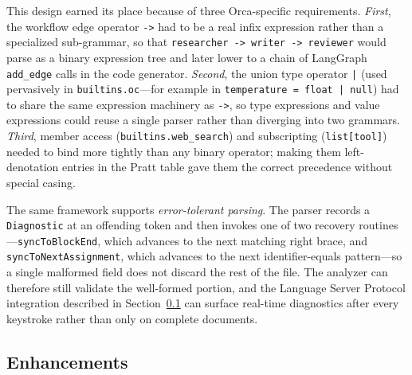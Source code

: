 \documentclass[sigconf,nonacm]{acmart}
\begin{document}
This design earned its place because of three Orca-specific requirements.
\emph{First}, the workflow edge operator \texttt{->} had to be a real
infix expression rather than a specialized sub-grammar, so that
\texttt{researcher -> writer -> reviewer} would parse as a binary
expression tree and later lower to a chain of LangGraph \texttt{add\_edge}
calls in the code generator. \emph{Second}, the union type operator
\texttt{|} (used pervasively in \texttt{builtins.oc}---for example in
\texttt{temperature = float | null}) had to share the same expression
machinery as \texttt{->}, so type expressions and value expressions could
reuse a single parser rather than diverging into two grammars.
\emph{Third}, member access (\texttt{builtins.web\_search}) and
subscripting (\texttt{list[tool]}) needed to bind more tightly than any
binary operator; making them left-denotation entries in the Pratt table
gave them the correct precedence without special casing.

The same framework supports \emph{error-tolerant parsing}. The parser
records a \texttt{Diagnostic} at an offending token and then invokes one of
two recovery routines---\texttt{syncToBlockEnd}, which advances to the next
matching right brace, and \texttt{syncToNextAssignment}, which advances to
the next identifier-equals pattern---so a single malformed field does not
discard the rest of the file. The analyzer can therefore still validate the
well-formed portion, and the Language Server Protocol integration described
in Section~\ref{sec:implementation:enhancements} can surface real-time
diagnostics after every keystroke rather than only on complete documents.

\subsection{Enhancements}
\label{sec:implementation:enhancements}
\end{document}
